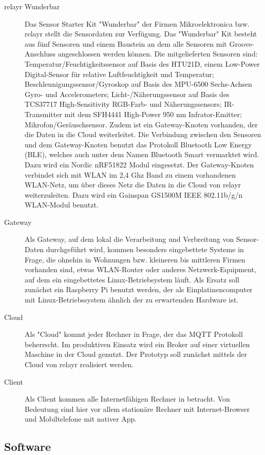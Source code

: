 \documentclass[fontsize=11pt,a4paper]{scrartcl}
\begin{document}
\begin{description}
\item[relayr Wunderbar]
Das Sensor Starter Kit "Wunderbar" der Firmen Mikroelektronica bzw. relayr stellt die Sensordaten zur Verfügung.
Das "Wunderbar" Kit besteht aus fünf Sensoren und einem Baustein an dem alle Sensoren mit Groove-Anschluss angeschlossen werden können.
Die mitgelieferten Sensoren sind:
Temperatur/Feuchtigkeitssensor auf Basis des HTU21D, einem Low-Power Digital-Sensor für relative Luftfeuchtigkeit und Temperatur;
Beschleunigungssensor/Gyroskop auf Basis des MPU-6500 Sechs-Achsen Gyro- und Accelerometers;
Licht-/Näherungssensor auf Basis des TCS37717 High-Sensitivity RGB-Farb- und Näherungssensors;
IR-Transmitter mit dem SFH4441 High-Power 950 nm Infrator-Emitter;
Mikrofon/Geräuschsensor.
Zudem ist ein Gateway-Knoten vorhanden, der die Daten in die Cloud weiterleitet.
Die Verbindung zwischen den Sensoren und dem Gateway-Knoten benutzt das Protokoll Bluetooth Low Energy (BLE), welches auch unter dem Namen Bluetooth Smart vermarktet wird.
Dazu wird ein Nordic nRF51822 Modul eingesetzt.
Der Gateway-Knoten verbindet sich mit WLAN im 2,4 Ghz Band zu einem vorhandenen WLAN-Netz, um über dieses Netz die Daten in die Cloud von relayr weiterzuleiten.
Dazu wird ein Gainspan GS1500M IEEE 802.11b/g/n WLAN-Modul benutzt.
\item[Gateway]
Als Gateway, auf dem lokal die Verarbeitung und Verbreitung von Sensor-Daten durchgeführt wird, kommen besonders eingebettete Systeme in Frage, die ohnehin in Wohnungen bzw. kleineren bis mittleren Firmen vorhanden sind, etwas WLAN-Router oder anderes Netzwerk-Equipment, auf dem ein eingebettetes Linux-Betriebsystem läuft.
Als Ersatz soll zunächst ein Raspberry Pi benutzt werden, der als Einplatinencomputer mit Linux-Betriebssystem ähnlich der zu erwartenden Hardware ist.
\item[Cloud]
Als "Cloud" kommt jeder Rechner in Frage, der das MQTT Protokoll beherrscht.
Im produktiven Einsatz wird ein Broker auf einer virtuellen Maschine in der Cloud genutzt.
Der Prototyp soll zunächst mittels der Cloud von relayr realisiert werden.
\item[Client]
Als Client kommen alle Internetfähigen Rechner in betracht.
Von Bedeutung sind hier vor allem stationäre Rechner mit Internet-Browser und Mobiltelefone mit nativer App.
\end{description}

\subsection{Software}
\end{document}
